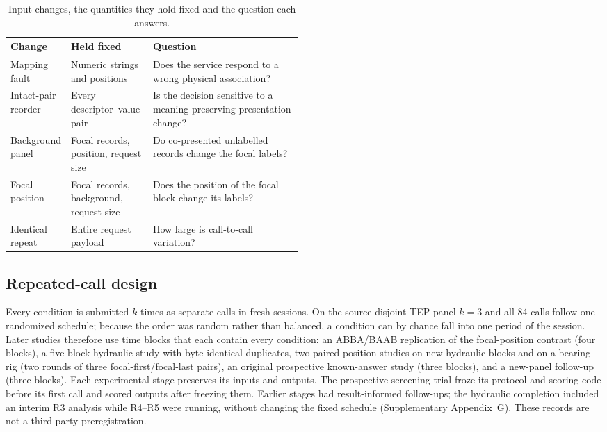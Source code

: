 \documentclass[11pt,a4paper]{article}
\begin{document}
\begin{table}[htbp]\centering\small
\caption{Input changes, the quantities they hold fixed and the question each answers.}
\label{tab:interventions}
\begin{tabularx}{\linewidth}{@{}>{\raggedright\arraybackslash}p{0.2\linewidth}>{\raggedright\arraybackslash}p{0.29\linewidth}>{\raggedright\arraybackslash}X@{}}\toprule
Change & Held fixed & Question \\\midrule
Mapping fault & Numeric strings and positions & Does the service respond to a wrong physical association? \\
Intact-pair reorder & Every descriptor--value pair & Is the decision sensitive to a meaning-preserving presentation change? \\
Background panel & Focal records, position, request size & Do co-presented unlabelled records change the focal labels? \\
Focal position & Focal records, background, request size & Does the position of the focal block change its labels? \\
Identical repeat & Entire request payload & How large is call-to-call variation? \\
\bottomrule\end{tabularx}\end{table}

\subsection{Repeated-call design}
Every condition is submitted $k$ times as separate calls in fresh sessions. On the source-disjoint TEP panel $k=3$ and all 84 calls follow one randomized schedule; because the order was random rather than balanced, a condition can by chance fall into one period of the session. Later studies therefore use time blocks that each contain every condition: an ABBA/BAAB replication of the focal-position contrast (four blocks), a five-block hydraulic study with byte-identical duplicates, two paired-position studies on new hydraulic blocks and on a bearing rig (two rounds of three focal-first/focal-last pairs), an original prospective known-answer study (three blocks), and a new-panel follow-up (three blocks). Each experimental stage preserves its inputs and outputs. The prospective screening trial froze its protocol and scoring code before its first call and scored outputs after freezing them. Earlier stages had result-informed follow-ups; the hydraulic completion included an interim R3 analysis while R4--R5 were running, without changing the fixed schedule (Supplementary Appendix~G). These records are not a third-party preregistration.
\end{document}
